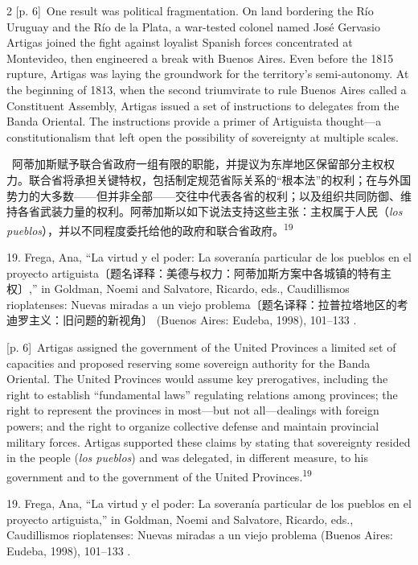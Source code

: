 \documentclass[10pt,a4paper]{article}
\begin{document}
\begin{paracol}{2}
\switchcolumn
{\scriptsize\color{gray} [p. 6]}\ One result was political fragmentation. On land bordering the Río Uruguay and the Río de la Plata, a war-tested colonel named José Gervasio Artigas joined the fight against loyalist Spanish forces concentrated at Montevideo, then engineered a break with Buenos Aires. Even before the 1815 rupture, Artigas was laying the groundwork for the territory’s semi-autonomy. At the beginning of 1813, when the second triumvirate to rule Buenos Aires called a Constituent Assembly, Artigas issued a set of instructions to delegates from the Banda Oriental. The instructions provide a primer of Artiguista thought—a constitutionalism that left open the possibility of sovereignty at multiple scales.\par
\switchcolumn*
{\scriptsize\color{gray} [p. 6]}\ 阿蒂加斯赋予联合省政府一组有限的职能，并提议为东岸地区保留部分主权权力。联合省将承担关键特权，包括制定规范省际关系的“根本法”的权利；在与外国势力的大多数——但并非全部——交往中代表各省的权利；以及组织共同防御、维持各省武装力量的权利。阿蒂加斯以如下说法支持这些主张：主权属于人民（\textit{los pueblos}），并以不同程度委托给他的政府和联合省政\mbox{府。\textsuperscript{19}}\par{\small 19. Frega, Ana, “La virtud y el poder: La soveranía particular de los pueblos en el proyecto artiguista〔题名译释：美德与权力：阿蒂加斯方案中各城镇的特有主权〕,” in Goldman, Noemi and Salvatore, Ricardo, eds., Caudillismos rioplatenses: Nuevas miradas a un viejo problema〔题名译释：拉普拉塔地区的考迪罗主义：旧问题的新视角〕 (Buenos Aires: Eudeba, 1998), 101–133 .\par}
\switchcolumn
{\scriptsize\color{gray} [p. 6]}\ Artigas assigned the government of the United Provinces a limited set of capacities and proposed reserving some sovereign authority for the Banda Oriental. The United Provinces would assume key prerogatives, including the right to establish “fundamental laws” regulating relations among provinces; the right to represent the provinces in most—but not all—dealings with foreign powers; and the right to organize collective defense and maintain provincial military forces. Artigas supported these claims by stating that sovereignty resided in the people (\textit{los pueblos}) and was delegated, in different measure, to his government and to the government of the United Provinces.\nobreak\textsuperscript{19}\par{\small 19. Frega, Ana, “La virtud y el poder: La soveranía particular de los pueblos en el proyecto artiguista,” in Goldman, Noemi and Salvatore, Ricardo, eds., Caudillismos rioplatenses: Nuevas miradas a un viejo problema (Buenos Aires: Eudeba, 1998), 101–133 .\par}

\end{paracol}
\end{document}
